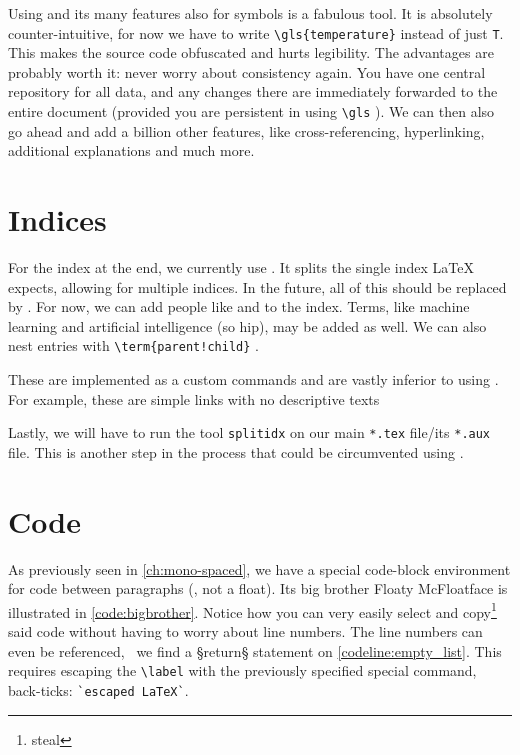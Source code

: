 Using  and its many features also for symbols is a fabulous tool.
It is absolutely counter-intuitive, for now we have to write \verb|\gls{temperature}| instead of just \verb|T|.
This makes the source code obfuscated and hurts legibility.
The advantages are probably worth it: never worry about consistency again.
You have one central repository for all data, and any changes there are immediately forwarded to the entire document (provided you are persistent in using \verb|\gls| ).
We can then also go ahead and add a billion other features, like cross-referencing, hyperlinking, additional explanations and much more.
\section{Indices}
For the index at the end, we currently use .
It splits the single index \LaTeX{} expects, allowing for multiple indices.
In the future, all of this should be replaced by .
For now, we can add people like  and  to the index.
Terms, like machine learning  and artificial intelligence  (so hip), may be added as well.
We can also nest entries with \verb|\term{parent!child}| .

These are implemented as a custom commands and are vastly inferior to using .
For example, these are simple links with no descriptive texts 

Lastly, we will have to run the tool \texttt{splitidx} on our main \texttt{*.tex} file/its \texttt{*.aux} file.
This is another step in the process that could be circumvented using .
\section{Code}
As previously seen in \cref{ch:mono-spaced}, we have a special code-block environment for code between paragraphs (, not a float).
Its big brother Floaty McFloatface is illustrated in \cref{code:bigbrother}.
Notice how you can very easily select and copy\footnote{steal} said code without having to worry about line numbers.
The line numbers can even be referenced, \ we find a §return§ statement on \cref{codeline:empty_list}.
This requires escaping the \verb|\label| with the previously specified special command, back-ticks: \verb|`escaped LaTeX`|.

